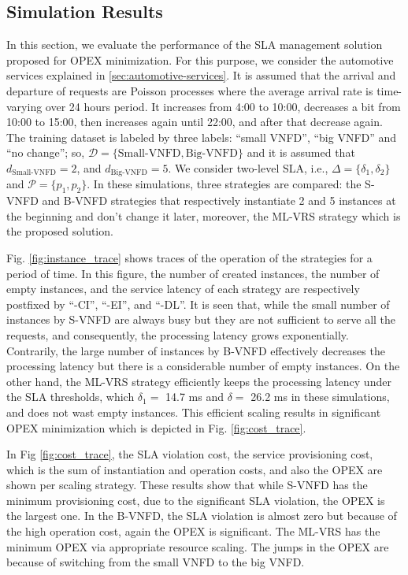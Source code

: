 \documentclass[conference, final]{IEEEtran}
\newcommand{\hlb}[2][blue]{{\color{#1} {#2}}\unskip }
\begin{document}
\subsection{Simulation Results}
\hlb{

In this section, we evaluate the performance of the SLA management solution proposed for OPEX minimization. For this purpose, we consider the automotive services explained in \ref{sec:automotive-services}. It is assumed that the arrival and departure of requests are Poisson processes where the average arrival rate is time-varying over 24 hours period.  It increases from 4:00 to 10:00, decreases a bit from 10:00 to 15:00, then increases again until 22:00, and after that decrease again. The training dataset is labeled by three labels: ``small VNFD'', ``big VNFD'' and ``no change''; so, $\mathcal{D}=\{\text{Small-VNFD}, \text{Big-VNFD}\}$ and it is assumed that $d_{\text{Small-VNFD}} = 2$, and $d_{\text{Big-VNFD}} = 5$. We consider two-level SLA, i.e., $\Delta=\{\delta_{1}, \delta_{2}\}$ and $\mathcal{P}=\{p_{1}, p_{2}\}$. In these simulations, three strategies are compared: the {\small \textsf{S-VNFD}} and {\small \textsf{B-VNFD}} strategies that respectively instantiate 2 and 5 instances at the beginning and don't change it later, moreover, the {\small \textsf{ML-VRS}} strategy which is the proposed solution.

Fig. \ref{fig:instance_trace} shows traces of the operation of the strategies for a period of time. In this figure, the number of created instances, the number of empty instances, and the service latency of each strategy are respectively postfixed by ``-CI'', ``-EI'', and ``-DL''. It is seen that, while the small number of instances by {\small \textsf{S-VNFD}} are always busy but they are not sufficient to serve all the requests, and consequently, the processing latency grows exponentially. Contrarily, the large number of instances by {\small \textsf{B-VNFD}} effectively decreases the processing latency but there is a considerable number of empty instances. On the other hand, the {\small \textsf{ML-VRS}} strategy efficiently keeps the processing latency under the SLA thresholds, which $\delta_{1} =$ 14.7 ms and $\delta =$ 26.2 ms in these simulations, and does not wast empty instances. This efficient scaling results in significant OPEX minimization which is depicted in Fig. \ref{fig:cost_trace}.

In Fig \ref{fig:cost_trace}, the SLA violation cost, the service provisioning cost, which is the sum of instantiation and operation costs, and also the OPEX are shown per scaling strategy. These results show that while {\small \textsf{S-VNFD}} has the minimum provisioning cost, due to the significant SLA violation, the OPEX is the largest one. In the  {\small \textsf{B-VNFD}}, the SLA violation is almost zero but because of the high operation cost, again the OPEX is significant. The {\small \textsf{ML-VRS}} has the minimum OPEX via appropriate resource scaling. The jumps in the OPEX are because of switching from the small VNFD to the big VNFD. 


}
\end{document}
